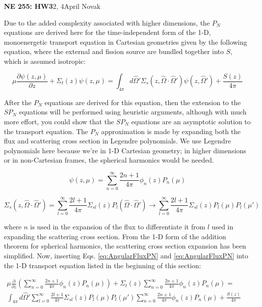 \documentclass[10pt]{article}
\newcommand*\circled[1]{\tikz[baseline=(char.base)]{
            \node[shape=circle,draw,inner sep=2pt] (char) {#1};}}
\begin{document}
\textbf{NE 255: HW3}2, 4\hfill April Novak\newline

\circled{1} Due to the added complexity associated with higher dimensions, the \(P_N\) equations are derived here for the time-independent form of the 1-D, monoenergetic transport equation in Cartesian geometries given by the following equation, where the external and fission source are bundled together into \(S\), which is assumed isotropic:

\begin{equation*}
\mu \frac{\partial \psi(z, \mu)}{\partial z} +
 \Sigma_t(z)\psi(z, \mu) =\int_{4\pi}^{} d\hat{\Omega}' \Sigma_s(z, \hat{\Omega}\cdot\hat{\Omega}')\psi(z,\hat{\Omega}') + \frac{S(z)}{4\pi}
 \end{equation*}

After the \(P_N\) equations are derived for this equation, then the extension to the \(SP_N\) equations will be performed using heuristic arguments, although with much more effort, you could show that the \(SP_N\) equations are an asymptotic solution to the transport equation. The \(P_N\) approximation is made by expanding both the flux and scattering cross section in Legendre polynomials. We use Legendre polynomials here because we're in 1-D Cartesian geometry; in higher dimensions or in non-Cartesian frames, the spherical harmonics would be needed.

\begin{equation}
\label{eq:AngularFluxPN}
\psi(z,\mu)=\sum_{n=0}^{\infty}\frac{2n+1}{4\pi}\phi_n(z)P_n(\mu)
\end{equation}

\begin{equation}
\label{eq:PNScatteringCrossSectionExpansion}
\Sigma_s(z,\hat{\Omega}\cdot\hat{\Omega}')=\sum_{l=0}^{\infty}\frac{2l+1}{4\pi}\Sigma_{sl}(z)P_l(\hat{\Omega}\cdot\hat{\Omega}')\rightarrow\sum_{l=0}^{\infty}\frac{2l+1}{4\pi}\Sigma_{sl}(z)P_l(\mu)P_l(\mu')
\end{equation}

where \(n\) is used in the expansion of the flux to differentiate it from \(l\) used in expanding the scattering cross section. From the 1-D form of the addition theorem for spherical harmonics, the scattering cross section expansion has been simplified. Now, inserting Eqs. \eqref{eq:AngularFluxPN} and \eqref{eq:AngularFluxPN} into the 1-D transport equation listed in the beginning of this section:

\begin{equation}
\begin{aligned}
\mu \frac{\partial}{\partial z}\left(\sum_{n=0}^{\infty}\frac{2n+1}{4\pi}\phi_n(z)P_n(\mu)\right) + \Sigma_t(z)\sum_{n=0}^{\infty}\frac{2n+1}{4\pi}\phi_n(z)P_n(\mu) =\quad\quad\\
\int_{4\pi}^{} d\hat{\Omega}' \sum_{l=0}^{\infty}\frac{2l+1}{4\pi}\Sigma_{sl}(z)P_l(\mu)P_l(\mu')\sum_{n=0}^{\infty}\frac{2n+1}{4\pi}\phi_n(z)P_n(\mu) + \frac{S(z)}{4\pi}
 \end{aligned}
 \end{equation}
\end{document}
